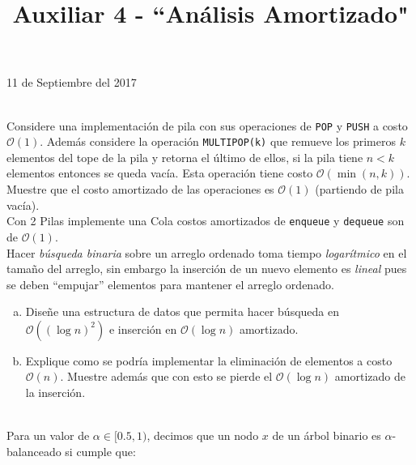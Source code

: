 \documentclass[dcc,uchile]{fcfmcourse}
\title{Auxiliar 4 - ``Análisis Amortizado"}
\theoremstyle{plain}
\theoremstyle{definition}
\begin{document}
\maketitle
\begin{center}
11 de Septiembre del 2017
\end{center}


\vspace{-1ex}


\begin{problems}
\\
Considere una implementación de pila con sus operaciones de \texttt{POP} y \texttt{PUSH} a costo $\mathcal{O}(1)$. Además considere la operación \texttt{MULTIPOP(k)} que remueve los primeros $k$ elementos del tope de la pila y retorna el último de ellos, si la pila tiene $n<k$ elementos entonces se queda vacía. Esta operación tiene costo $\mathcal{O}(\min(n, k))$.\\
Muestre que el costo amortizado de las operaciones es $\mathcal{O}(1)$ (partiendo de pila vacía).
\\
Con 2 Pilas implemente una Cola costos amortizados de \texttt{enqueue} y \texttt{dequeue} son de $\mathcal{O}(1)$.
\\
Hacer \textit{búsqueda binaria} sobre un arreglo ordenado toma tiempo \textit{logarítmico} en el tamaño del arreglo, sin embargo la inserción de un nuevo elemento es \textit{lineal} pues se deben ``empujar'' elementos para mantener el arreglo ordenado.
\begin{enumerate}[a)]
    \item Diseñe una estructura de datos que permita hacer búsqueda en $\mathcal{O}\left((\log n)^2\right)$ e inserción en $\mathcal{O}(\log n)$ amortizado.
    \item Explique como se podría implementar la eliminación de elementos a costo $\mathcal{O}\left(n\right)$. Muestre además que con esto se pierde el $\mathcal{O}(\log n)$ amortizado de la inserción.
\end{enumerate}
\\
Para un valor de $\alpha \in [0.5, 1)$, decimos que un nodo $x$ de un árbol binario es $\alpha$-balanceado si cumple que:

\end{problems}
\end{document}
